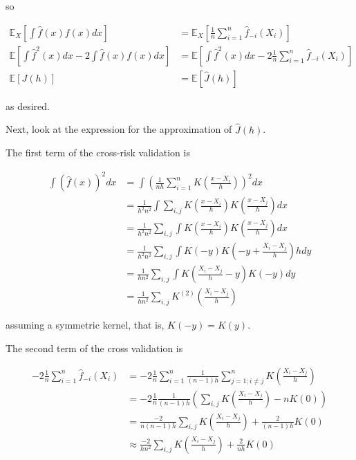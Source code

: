 so

\begin{align*}
\mathbb{E}_X\left[ \int \hat{f}(x) f(x) dx \right] &= \mathbb{E}_X\left[ \frac{1}{n} \sum_{i=1}^{n} \hat{f}_{-i}(X_{i}) \right] \\
\mathbb{E}\left[ \int \hat{f}^{2}(x) dx - 2 \int \hat{f}(x) f(x) dx \right] &= \mathbb{E}\left[ \int \hat{f}^{2}(x) dx - 2 \frac{1}{n} \sum_{i=1}^{n} \hat{f}_{-i}(X_{i}) \right] \\
\mathbb{E}[J(h)] &= \mathbb{E}[\hat{J}(h)]
\end{align*}

as desired.

Next,  look at the expression for the approximation of
\(\hat{J}(h)\).

The first term of the cross-risk validation is

\begin{align*}
\int \left(\hat{f}(x)\right)^{2} dx &= \int \left( \frac{1}{nh} \sum_{i=1}^{n} K\left( \frac{x - X_{i}}{h} \right) \right)^{2} dx \\
&= \frac{1}{h^{2}n^{2}} \int \sum_{i, j} K \left(\frac{x - X_{i}}{h}\right) K\left(\frac{x - X_{j}}{h}\right) dx \\
&= \frac{1}{h^{2}n^{2}} \sum_{i, j} \int  K \left(\frac{x - X_{i}}{h}\right) K\left(\frac{x - X_{j}}{h}\right) dx \\
&= \frac{1}{h^{2}n^{2}} \sum_{i, j} \int  K(-y) K\left(-y + \frac{X_{i} - X_{j}}{h} \right) h dy \\
&= \frac{1}{hn^{2}} \sum_{i, j} \int  K\left(\frac{X_{i} - X_{j}}{h} - y \right) K(-y) dy \\
&= \frac{1}{hn^{2}} \sum_{i, j} K^{(2)} \left(\frac{X_{i} - X_{j}}{h} \right)
\end{align*}

assuming a symmetric kernel, that is, \(K(-y) = K(y)\).

The second term of the cross validation is

\begin{align*}
- 2 \frac{1}{n} \sum_{i=1}^{n} \hat{f}_{-i}(X_{i})
&= -2 \frac{1}{n} \sum_{i=1}^{n} \frac{1}{(n - 1) h} \sum_{j=1; i \neq j}^{n} K \left( \frac{X_{i} - X_{j}}{h} \right) \\
&= -2 \frac{1}{n} \frac{1}{(n - 1) h} \left( \sum_{i, j} K \left( \frac{X_{i} - X_{j}}{h} \right) - n K(0)\right) \\
&= \frac{-2}{n (n - 1) h} \sum_{i, j} K \left( \frac{X_{i} - X_{j}}{h} \right)
+ \frac{2}{(n - 1) h} K(0) \\
&\approx \frac{-2}{h n^{2}} \sum_{i, j} K \left( \frac{X_{i} - X_{j}}{h} \right)
+ \frac{2}{nh} K(0)
\end{align*}

